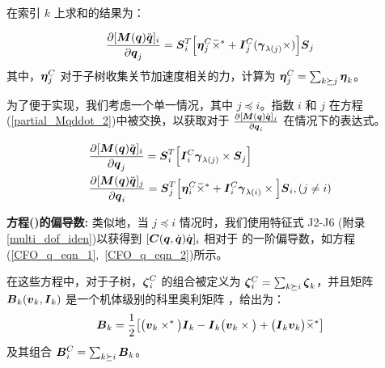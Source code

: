 \documentclass[letterpaper, 10 pt, conference]{ieeetran}  %
\begin{document}
在索引 $k$ 上求和的结果为：

\begin{equation}
\frac{\partial [ \M(\q) \qdd]_{i}}{\partial \red{\q_{j}}} = \red{\Phibar_{i}^{T} \Big[\etabar_{j}^{C} \crff  + \I_{j}^{C} (\gammabar_{\lambda(j)} \times) \Big] \Phibar_{j}}
    \label{partial_Mqddot_2}
\end{equation}
其中，$\boldsymbol{\eta}_{j}^{C}$ 对于子树收集关节加速度相关的力，计算为 $\boldsymbol{\eta}_{j}^{C} = \sum_{k \succeq j} \boldsymbol{\eta}_{k}$。

为了便于实现，我们考虑一个单一情况，其中 $j \preceq i$。指数 $i$ 和 $j$ 在方程(\ref{partial_Mqddot_2})中被交换，以获取对于 $\frac{\partial [\boldsymbol{M}(\boldsymbol{q})\ddot{\boldsymbol{q}}]_{j}}{\partial \boldsymbol{q}_{i}}$ 在情况下的表达式。

\begin{align}
    & \frac{\partial [ \M(\q) \qdd]_{i}}{\partial \red{\q_{j}}} = \red{\Phibar_{i}^{T} \Big[  \I_{i}^{C}  \gammabar_{\lambda(j)}   \times \Phibar_{j} \Big]}  \label{Mqddot_FO_eqn} \\
    & \frac{\partial [ \M(\q)\qdd]_{j}}{\partial \red{\q_{i}}} = \red{\Phibar_{j}^{T} \Big[\etabar_{i}^{C} \crff + \I_{i}^{C} \gammabar_{\lambda(i)} \times  \Big] \Phibar_{i}, (j \neq i)} \nonumber
\end{align}



\vspace{1ex}
{\noindent \bf 
方程(\red{\ref{cqdot_exp_2}})的偏导数:} 类似地，当 $j \preceq i$ 情况时，我们使用特征式 J2-J6 (附录 \ref{multi_dof_iden})以获得到 $[\boldsymbol{C}(\boldsymbol{q},\dot{\boldsymbol{q}}) \dot{\boldsymbol{q}}]_{i}$ 相对于  的一阶偏导数­，如方程(\ref{CFO_q_eqn_1},~\ref{CFO_q_eqn_2})所示。

 在这些方程中，对于子树，$\boldsymbol{\zeta}_{i}^C$ 的组合被定义为 $\boldsymbol{\zeta}{}_{i}^{C} = \sum_{k \succeq i} \boldsymbol{\zeta}_{k}$，并且矩阵 $\boldsymbol{B}{}_{k}(\boldsymbol{v}_{k},\boldsymbol{I}{}_{k})$ 是一个机体级别的科里奥利矩阵 \cite{nei_ms,nei_slotine,eche}，给出为：
\begin{equation}
    \B_{k} = \frac{1}{2} \big[ \big(\v_{k}\times^* \big)\I_{k} - \I_{k} \big(\v_{k} \times   \big) + \big(\I_{k} \v_{k} \big) \crff    \big]
    \label{bl_term_defn}
\end{equation}
%
及其组合 $\boldsymbol{B}{}{}_i^C = \sum_{k\succeq i} \boldsymbol{B}{}_k$。
\end{document}
